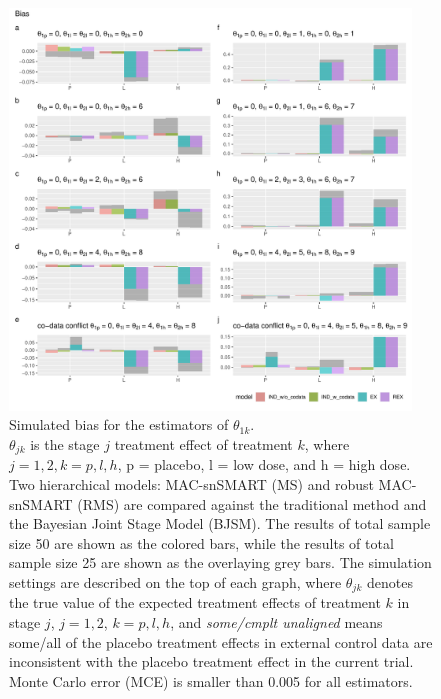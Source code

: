 \begin{figure}
\includegraphics[width=0.95\textwidth]{chapters/figures/Bias1.pdf}
\caption{Simulated bias for the estimators of $\theta_{1k}$. \\ $\theta_{jk}$ is the stage $j$ treatment effect of treatment $k$, where $j = 1,2, k = p, l, h$, p = placebo, l = low dose, and h = high dose. Two hierarchical models: MAC-snSMART (MS) and robust MAC-snSMART (RMS) are compared against the traditional method and the Bayesian Joint Stage Model (BJSM). The results of total sample size 50 are shown as the colored bars, while the results of total sample size 25 are shown as the overlaying grey bars. The simulation settings are described on the top of each graph, where $\theta_{jk}$ denotes the true value of the expected treatment effects of treatment $k$ in stage $j$, $j = 1, 2$, $k = p, l, h$, and \emph{some/cmplt unaligned} means some/all of the placebo treatment effects in external control data are inconsistent with the placebo treatment effect in the current trial. Monte Carlo error (MCE) is smaller than 0.005 for all estimators.}
\label{fig:Bias}
\end{figure}


